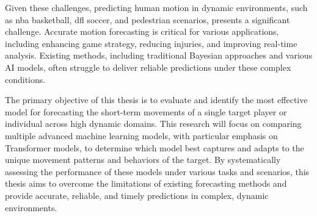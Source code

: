 Given these challenges, predicting human motion in dynamic environments, such as \gls{nba} basketball, \gls{dfl} soccer, and pedestrian scenarios, presents a significant challenge. Accurate motion forecasting is critical for various applications, including enhancing game strategy, reducing injuries, and improving real-time analysis. Existing methods, including traditional Bayesian approaches and various AI models, often struggle to deliver reliable predictions under these complex conditions.

The primary objective of this thesis is to evaluate and identify the most effective model for forecasting the short-term movements of a single target player or individual across high dynamic domains. This research will focus on comparing multiple advanced machine learning models, with particular emphasis on Transformer models, to determine which model best captures and adapts to the unique movement patterns and behaviors of the target. By systematically assessing the performance of these models under various tasks and scenarios, this thesis aims to overcome the limitations of existing forecasting methods and provide accurate, reliable, and timely predictions in complex, dynamic environments.
